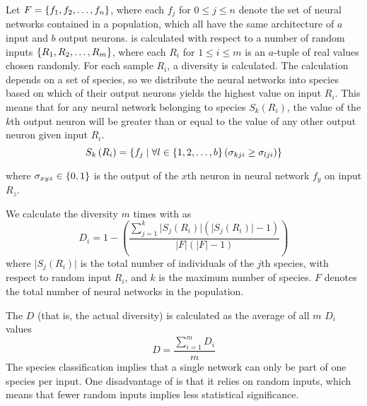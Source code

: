Let $F = \left\{ f_1, f_2, \dots, f_n \right\}$, where each $f_j$ for $0 \leq j \leq n$ denote the set of neural networks contained in a population, which all have the same architecture of $a$ input and $b$ output neurons. \dia{} is calculated with respect to a number of random inputs $\left\{ R_1, R_2, \dots, R_m \right\}$, where each $R_i$ for $1 \leq i \leq m$ is an $a$-tuple of real values chosen randomly. For each sample $R_i$, a diversity is calculated. The calculation depends on a set of species, so we distribute the neural networks into species based on which of their output neurons yields the highest value on input $R_i$. This means that for any neural network belonging to species $S_k(R_i)$, the value of the $k$th output neuron will be greater than or equal to the value of any other output neuron given input $R_i$.%
%
\begin{equation*}\label{eq:species}
  S_k\left(R_i\right) = \left\{ f_j \mid \forall l \in \left\{ 1, 2, \dots, b \right\} \left(\sigma_{kji} \geq \sigma_{lji}\right) \right\}
\end{equation*}
%

where $\sigma_{xyz} \in \left\{ 0, 1 \right\}$ is the output of the $x$th neuron in neural network $f_y$ on input $R_z$.

We calculate the diversity $m$ times with \dia{} as
%
\begin{equation*}\label{eq:sdi}
  D_i = 1 - \left(\frac{\sum_{j=1}^{k}\lvert S_j\left(R_i\right)\rvert\left(\lvert S_j\left(R_i\right)\rvert - 1\right)}{\lvert F\rvert \left(\lvert F\rvert - 1\right)}\right) 
\end{equation*}
%
where $\lvert S_j(R_i)\rvert$ is the total number of individuals of the $j$th species, with respect to random input $R_i$, and $k$ is the maximum number of species. $F$ denotes the total number of neural networks in the population. 

The \dia{} $D$ (that is, the actual diversity) is calculated as the average of all $m$ $D_i$ values
%
\[D =\frac{\sum_{i=1}^m{D_i}}{m}\]
%
The species classification implies that a single network can only be part of one species per input. One disadvantage of \dia{} is that it relies on random inputs, which means that fewer random inputs implies less statistical significance.

